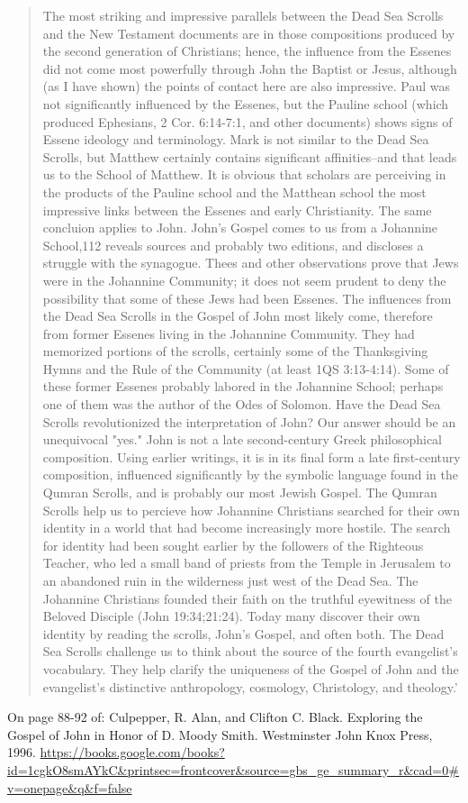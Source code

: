 \documentclass[11pt]{article}
\begin{document}
\begin{thebibliography}{37}
\begin{quote}
The most striking and impressive parallels between the Dead Sea Scrolls and the New Testament documents are in those compositions produced by the second generation of Christians; hence, the influence from the Essenes did not come most powerfully through John the Baptist or Jesus, although (as I have shown) the points of contact here are also impressive. Paul was not significantly influenced by the Essenes, but the Pauline school (which produced Ephesians, 2 Cor. 6:14-7:1, and other documents) shows signs of Essene ideology and terminology. Mark is not similar to the Dead Sea Scrolls, but Matthew certainly contains significant affinities--and that leads us to the School of Matthew. It is obvious that scholars are perceiving in the products of the Pauline school and the Matthean school the most impressive links between the Essenes and early Christianity. The same concluion applies to John. John's Gospel comes to us from a Johannine School,112 reveals sources and probably two editions, and discloses a struggle with the synagogue. Thees and other observations prove that Jews were in the Johannine Community; it does not seem prudent to deny the possibility that some of these Jews had been Essenes. The influences from the Dead Sea Scrolls in the Gospel of John most likely come, therefore from former Essenes living in the Johannine Community. They had memorized portions of the scrolls, certainly some of the Thanksgiving Hymns and the Rule of the Community (at least 1QS 3:13-4:14). Some of these former Essenes probably labored in the Johannine School; perhaps one of them was the author of the Odes of Solomon. 
Have the Dead Sea Scrolls revolutionized the interpretation of John? Our answer should be an unequivocal "yes." John is not a late second-century Greek philosophical composition. Using earlier writings, it is in its final form a late first-century composition, influenced significantly by the symbolic language found in the Qumran Scrolls, and is probably our most Jewish Gospel. The Qumran Scrolls help us to percieve how Johannine Christians searched for their own identity in a world that had become increasingly more hostile. The search for identity had been sought earlier by the followers of the Righteous Teacher, who led a small band of priests from the Temple in Jerusalem to an abandoned ruin in the wilderness just west of the Dead Sea. The Johannine Christians founded their faith on the truthful eyewitness of the Beloved Disciple (John 19:34;21:24). Today many discover their own identity by reading the scrolls, John's Gospel, and often both.
The Dead Sea Scrolls challenge us to think about the source of the fourth evangelist's vocabulary. They help clarify the uniqueness of the Gospel of John and the evangelist's distinctive anthropology, cosmology, Christology, and theology.'
\end{quote}
On page 88-92 of: 
Culpepper, R. Alan, and Clifton C. Black. Exploring the Gospel of John in Honor of D. Moody Smith. Westminster John Knox Press, 1996.
\url{https://books.google.com/books?id=1cgkO8smAYkC&printsec=frontcover&source=gbs_ge_summary_r&cad=0#v=onepage&q&f=false}


\end{thebibliography}
\end{document}
